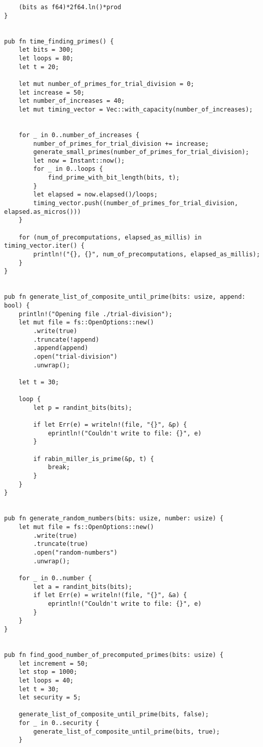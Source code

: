 \begin{verbatim}
    (bits as f64)*2f64.ln()*prod
}


pub fn time_finding_primes() {
    let bits = 300;
    let loops = 80;
    let t = 20;

    let mut number_of_primes_for_trial_division = 0;
    let increase = 50;
    let number_of_increases = 40;
    let mut timing_vector = Vec::with_capacity(number_of_increases);


    for _ in 0..number_of_increases {
        number_of_primes_for_trial_division += increase;
        generate_small_primes(number_of_primes_for_trial_division);
        let now = Instant::now();
        for _ in 0..loops {
            find_prime_with_bit_length(bits, t);
        }
        let elapsed = now.elapsed()/loops;
        timing_vector.push((number_of_primes_for_trial_division, elapsed.as_micros()))
    }

    for (num_of_precomputations, elapsed_as_millis) in timing_vector.iter() {
        println!("{}, {}", num_of_precomputations, elapsed_as_millis);
    }
}


pub fn generate_list_of_composite_until_prime(bits: usize, append: bool) {
    println!("Opening file ./trial-division");
    let mut file = fs::OpenOptions::new()
        .write(true)
        .truncate(!append)
        .append(append)
        .open("trial-division")
        .unwrap();

    let t = 30;

    loop {
        let p = randint_bits(bits);

        if let Err(e) = writeln!(file, "{}", &p) {
            eprintln!("Couldn't write to file: {}", e)
        }
        
        if rabin_miller_is_prime(&p, t) {
            break;
        }
    }
}


pub fn generate_random_numbers(bits: usize, number: usize) {
    let mut file = fs::OpenOptions::new()
        .write(true)
        .truncate(true)
        .open("random-numbers")
        .unwrap();

    for _ in 0..number {
        let a = randint_bits(bits);
        if let Err(e) = writeln!(file, "{}", &a) {
            eprintln!("Couldn't write to file: {}", e)
        }
    }
}


pub fn find_good_number_of_precomputed_primes(bits: usize) {
    let increment = 50;
    let stop = 1000;
    let loops = 40;
    let t = 30;
    let security = 5;

    generate_list_of_composite_until_prime(bits, false);
    for _ in 0..security {
        generate_list_of_composite_until_prime(bits, true);
    }


\end{verbatim}
